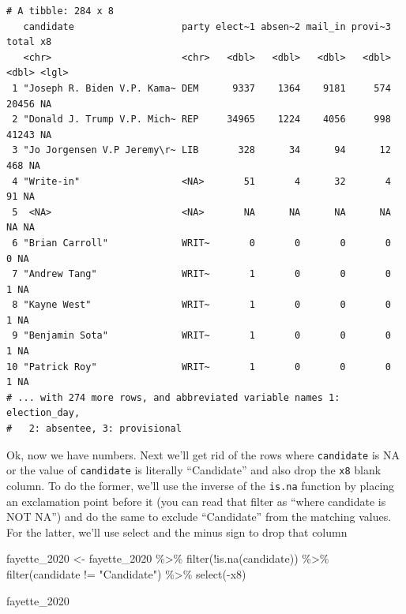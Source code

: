 \documentclass[
  letterpaper,
  DIV=11,
  numbers=noendperiod]{scrreprt}
\newenvironment{Shaded}{\begin{snugshade}}{\end{snugshade}}
\newcommand{\FunctionTok}[1]{\textcolor[rgb]{0.28,0.35,0.67}{#1}}
\newcommand{\NormalTok}[1]{\textcolor[rgb]{0.00,0.23,0.31}{#1}}
\newcommand{\OtherTok}[1]{\textcolor[rgb]{0.00,0.23,0.31}{#1}}
\newcommand{\SpecialCharTok}[1]{\textcolor[rgb]{0.37,0.37,0.37}{#1}}
\newcommand{\StringTok}[1]{\textcolor[rgb]{0.13,0.47,0.30}{#1}}
\begin{document}
\begin{verbatim}
# A tibble: 284 x 8
   candidate                   party elect~1 absen~2 mail_in provi~3 total x8   
   <chr>                       <chr>   <dbl>   <dbl>   <dbl>   <dbl> <dbl> <lgl>
 1 "Joseph R. Biden V.P. Kama~ DEM      9337    1364    9181     574 20456 NA   
 2 "Donald J. Trump V.P. Mich~ REP     34965    1224    4056     998 41243 NA   
 3 "Jo Jorgensen V.P Jeremy\r~ LIB       328      34      94      12   468 NA   
 4 "Write-in"                  <NA>       51       4      32       4    91 NA   
 5  <NA>                       <NA>       NA      NA      NA      NA    NA NA   
 6 "Brian Carroll"             WRIT~       0       0       0       0     0 NA   
 7 "Andrew Tang"               WRIT~       1       0       0       0     1 NA   
 8 "Kayne West"                WRIT~       1       0       0       0     1 NA   
 9 "Benjamin Sota"             WRIT~       1       0       0       0     1 NA   
10 "Patrick Roy"               WRIT~       1       0       0       0     1 NA   
# ... with 274 more rows, and abbreviated variable names 1: election_day,
#   2: absentee, 3: provisional
\end{verbatim}

Ok, now we have numbers. Next we'll get rid of the rows where
\texttt{candidate} is NA or the value of \texttt{candidate} is literally
``Candidate'' and also drop the \texttt{x8} blank column. To do the
former, we'll use the inverse of the \texttt{is.na} function by placing
an exclamation point before it (you can read that filter as ``where
candidate is NOT NA'') and do the same to exclude ``Candidate'' from the
matching values. For the latter, we'll use select and the minus sign to
drop that column

\begin{Shaded}
\begin{Highlighting}[]
\NormalTok{fayette\_2020 }\OtherTok{\textless{}{-}}\NormalTok{ fayette\_2020 }\SpecialCharTok{\%\textgreater{}\%} \FunctionTok{filter}\NormalTok{(}\SpecialCharTok{!}\FunctionTok{is.na}\NormalTok{(candidate)) }\SpecialCharTok{\%\textgreater{}\%} \FunctionTok{filter}\NormalTok{(candidate }\SpecialCharTok{!=} \StringTok{"Candidate"}\NormalTok{) }\SpecialCharTok{\%\textgreater{}\%} \FunctionTok{select}\NormalTok{(}\SpecialCharTok{{-}}\NormalTok{x8)}

\NormalTok{fayette\_2020}
\end{Highlighting}
\end{Shaded}
\end{document}
